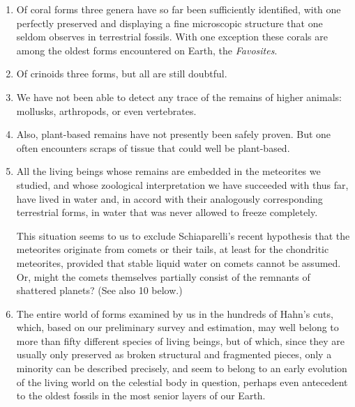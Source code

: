 \documentclass[a4paper, 12pt, oneside]{article}
\begin{document}
\begin{enumerate}
\item Of coral forms three genera have so far been sufficiently identified, with one perfectly preserved and displaying a fine microscopic structure that one seldom observes in terrestrial fossils. With one exception these corals are among the oldest forms encountered on Earth, the \emph{Favosites}.

\item Of crinoids three forms, but all are still doubtful.

\item We have not been able to detect any trace of the remains of higher animals: mollusks, arthropods, or even vertebrates.

\item Also, plant-based remains have not presently been safely proven. But one often encounters scraps of tissue that could well be plant-based.

\item All the living beings whose remains are embedded in the meteorites we studied, and whose zoological interpretation we have succeeded with thus far, have lived in water and, in accord with their analogously corresponding terrestrial forms, in water that was never allowed to freeze completely.

This situation seems to us to exclude Schiaparelli's recent hypothesis that the meteorites originate from comets or their tails, at least for the chondritic meteorites, provided that stable liquid water on comets cannot be assumed. Or, might the comets themselves partially consist of the remnants of shattered planets? (See also 10 below.)

\item The entire world of forms examined by us in the hundreds of Hahn's cuts, which, based on our preliminary survey and estimation, may well belong to more than fifty different species of living beings, but of which, since they are usually only preserved as broken structural and fragmented pieces, only a minority can be described precisely, and seem to belong to an early evolution of the living world on the celestial body in question, perhaps even antecedent to the oldest fossils in the most senior layers of our Earth.


\end{enumerate}
\end{document}
